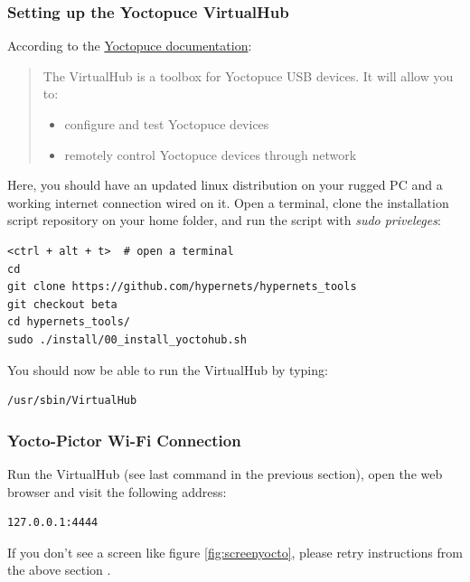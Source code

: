 \subsubsection{Setting up the Yoctopuce VirtualHub}
\label{sec:virtualhub}
\par 
According to the \href{https://www.yoctopuce.com/EN/virtualhub.php}{Yoctopuce
documentation}: 
\begin{quotation}
The VirtualHub is a toolbox for Yoctopuce USB devices. It will allow you
to:
	\begin{itemize}
	 \item configure and test Yoctopuce devices
	 \item remotely control Yoctopuce devices through network
	\end{itemize}
\end{quotation}

Here, you should have an updated linux distribution on your rugged PC and
a working internet connection wired on it.
Open a terminal, clone the installation script repository on your home folder,
and run the script with \emph{sudo priveleges}:

\begin{lstlisting}
<ctrl + alt + t>  # open a terminal
cd
git clone https://github.com/hypernets/hypernets_tools
git checkout beta
cd hypernets_tools/
sudo ./install/00_install_yoctohub.sh
\end{lstlisting}
You should now be able to run the VirtualHub by typing:
\begin{lstlisting}
/usr/sbin/VirtualHub
\end{lstlisting}

\subsubsection{Yocto-Pictor Wi-Fi Connection}
\label{sec:yocto-wifi}
\par
Run the VirtualHub (see last command in the previous section), 
open the web browser and visit the following address:
\begin{lstlisting}
127.0.0.1:4444
\end{lstlisting}
\par
If you don't see a screen like figure \ref{fig:screenyocto}, please retry 
instructions from the above section \pageref{sec:virtualhub}. 

